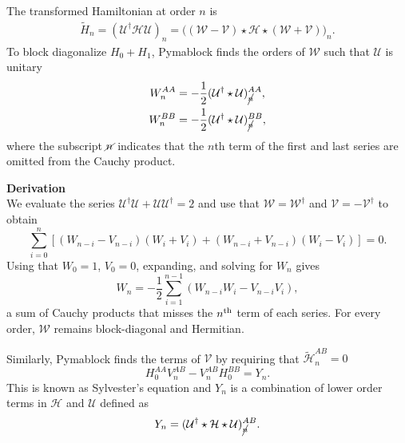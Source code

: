 The transformed Hamiltonian at order $n$ is
%
\begin{align}
\label{h_tilde}
\tilde{H}_{n} = (\mathcal{U}^{\dagger} \mathcal{H}
\mathcal{U})_{n} = \Big ( (\mathcal{W}-\mathcal{V}) \star \mathcal{H} \star
(\mathcal{W}+\mathcal{V}) \Big)_{n}.
\end{align}
%
To block diagonalize $H_0 + H_1$, Pymablock finds the
orders of $\mathcal{W}$ such that $\mathcal{U}$ is unitary
%
\begin{align}
\label{unitarity}
W_{n}^{AA} &= - \frac{1}{2} (\mathcal{U}^{\dagger} \star \mathcal{U})_{\cancel{n}}^{AA}, \\
W_{n}^{BB} &= - \frac{1}{2} (\mathcal{U}^{\dagger} \star \mathcal{U})_{\cancel{n}}^{BB},
\end{align}
%
where the subscript $\cancel{n}$ indicates that the $n$th term of the first
and last series are omitted from the Cauchy product.

\begin{framed}
\textbf{Derivation}\\
We evaluate the series $\mathcal{U}^\dagger \mathcal{U} + \mathcal{U}\mathcal{U}^\dagger=2$
and use that
$\mathcal{W}=\mathcal{W}^\dagger$ and $\mathcal{V}= -\mathcal{V}^{\dagger}$
to obtain
%
\begin{equation}
\sum_{i=0}^n \left[(W_{n-i} - V_{n-i})(W_i +
V_i) + (W_{n-i} + V_{n-i})(W_i - V_i)\right] = 0.
\end{equation}
%
Using that $W_0=1$, $V_0=0$, expanding, and solving for
$W_n$ gives
%
\begin{equation}
W_{n} = - \frac{1}{2}
\sum_{i=1}^{n-1}(W_{n-i}W_i - V_{n-i}V_i),
\end{equation}
%
a sum of Cauchy products that misses the $n \textsuperscript{th}$ term of each
series.
For every order, $\mathcal{W}$ remains block-diagonal and Hermitian.
\end{framed}

Similarly, Pymablock finds the terms of $\mathcal{V}$ by requiring that
$\tilde{\mathcal{H}}^{AB}_n=0$
%
\begin{equation}
\label{sylvester}
H_0^{AA} V_{n}^{AB} - V_{n}^{AB} H_0^{BB} = Y_{n}.
\end{equation}
%
This is known as Sylvester's equation and $Y_{n}$ is a combination of lower
order terms in $\mathcal{H}$ and $\mathcal{U}$ defined as
%
\begin{equation}
Y_n = (\mathcal{U}^\dagger \star \mathcal{H} \star \mathcal{U})_{\cancel{n}}^{AB}.
\end{equation}

